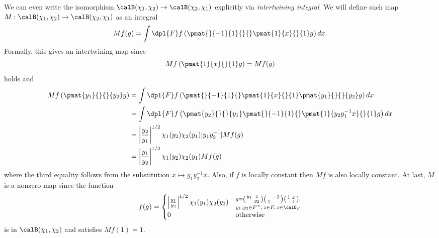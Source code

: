 \documentclass{article}
\newcommand{\smat}[4]{\left(\begin{smallmatrix} #1 & #2 \\ #3 & #4 \end{smallmatrix}\right)}
\begin{document}
We can even write the isomorphism $\calB(\chi_1, \chi_2) \to \calB(\chi_2, \chi_1)$ explicitly via \emph{intertwining integral}. 
We will define such map $M:\calB(\chi_1, \chi_2) \to \calB(\chi_2, \chi_1)$ as an integral
$$
Mf(g) = \int\dpl{F} f\left( \pmat{}{-1}{1}{}{}\pmat{1}{x}{}{1} g\right) dx.
$$
Formally, this gives an intertwining map since
$$
Mf\left(\pmat{1}{x}{}{1}g\right) = Mf(g)
$$
holds and 
\begin{align*}
Mf\left( \pmat{y_{1}}{}{}{y_{2}}g \right) &= \int\dpl{F} f\left( \pmat{}{-1}{1}{} \pmat{1}{x}{}{1}\pmat{y_{1}}{}{}{y_{2}}g\right) dx \\
&= \int\dpl{F} f\left( \pmat{y_{2}}{}{}{y_{1}} \pmat{}{-1}{1}{} \pmat{1}{y_{2}y_{1}^{-1}x}{}{1}g\right)dx \\
&=\left| \frac{y_{2}}{y_{1}}\right|^{1/2} \chi_{1}(y_{2})\chi_{2}(y_{1}) |y_{1}y_{2}^{-1}| Mf(g) \\
&=\left|\frac{y_{1}}{y_{2}}\right|^{1/2} \chi_{1}(y_{2})\chi_{2}(y_{1}) Mf(g)
\end{align*}
where the third equality follows from the substitution $x\mapsto y_{1}y_{2}^{-1}x$. Also, if $f$ is locally constant then $Mf$ is also locally constant. At last, $M$ is a nonzero map since the function
$$
f(g) = \begin{cases} \left|\frac{y_{1}}{y_{2}}\right|^{1/2} \chi_{1}(y_{1})\chi_{2}(y_{2}) & \substack{g = \smat{y_{1}}{z}{}{y_{2}} \smat{}{-1}{1}{} \smat{1}{x}{}{1}, \\ y_{1}, y_{2}\in F^{\times},\, z\in F,\, x\in \calO_F }\\
0 & \text{otherwise} \end{cases}
$$
is in $\calB(\chi_1, \chi_2)$ and satisfies $Mf(1) = 1$. 
\end{document}
